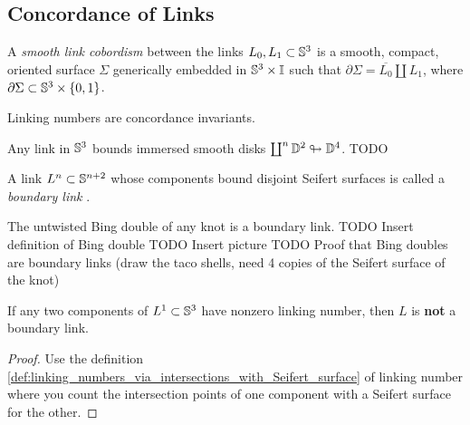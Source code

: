 \subsection{Concordance of Links}

\begin{definition}
	A \textit{smooth link cobordism}  between the links
	$L_0, L_1 \subset \mathbb{S}^{3}$
	is a smooth, compact, oriented surface
	$\Sigma$ generically embedded in $\mathbb{S}^{3} \times \mathbb{I}$ such that
	$\partial \Sigma = \overline{L_{0}} \coprod L_{1}$,
	where $\partial \Sigma \subset \mathbb{S}^{3} \times \{0, 1\}$.
\end{definition}

\begin{proposition}
	Linking numbers are concordance invariants.
\end{proposition}

\begin{remark}
	Any link in $\mathbb{S}^{3}$ bounds immersed smooth disks
	$\coprod^{n} \mathbb{D}^{2} \looparrowright \mathbb{D}^{4}$.
	TODO
\end{remark}


\begin{definition}
	A link $L^{n} \subset \mathbb{S}^{n+2}$ whose components bound disjoint Seifert surfaces
	is called a \textit{boundary link} .
\end{definition}

\begin{example}
	The untwisted Bing double of any knot is a boundary link.
	TODO Insert definition of Bing double
	TODO Insert picture
	TODO Proof that Bing doubles are boundary links
	(draw the taco shells, need 4 copies of the Seifert surface
	of the knot)
\end{example}

\begin{proposition}
	If any two components of $L^{1} \subset \mathbb{S}^{3}$
	have nonzero linking number, then $L$ is \textbf{not}
	a boundary link.
\end{proposition}

\begin{proof}
	Use the definition \ref{def:linking_numbers_via_intersections_with_Seifert_surface} 
	of linking number where you count
	the intersection points of one component with a Seifert surface for the
	other.
\end{proof}

